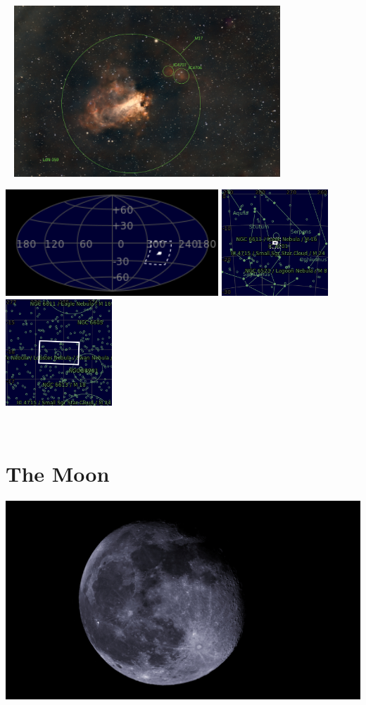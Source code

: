 \begin{center}
 \ \newpage
\includegraphics[width=0.75\textwidth]{../Imaging//Annotated/Swann_Nebula_Annotated.jpg}

\includegraphics[height=4cm]{../Imaging//Annotated/Swann_Nebula_Globe.jpg}
\includegraphics[height=4cm]{../Imaging//Annotated/Swann_Nebula_Close.jpg}
\includegraphics[height=4cm]{../Imaging//Annotated/Swann_Nebula_Closer.jpg}
\end{center}
\ \\\section{The Moon}
\includegraphics[width=\textwidth]{../Imaging//Original/The_Moon.jpg}
